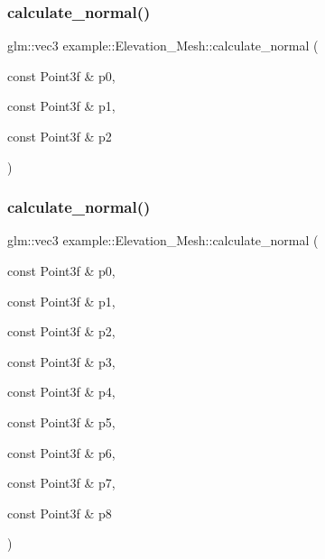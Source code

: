 \subsubsection{\texorpdfstring{calculate\+\_\+normal()}{calculate\_normal()}\hspace{0.1cm}{\footnotesize\ttfamily [1/2]}}
{\footnotesize\ttfamily glm\+::vec3 example\+::\+Elevation\+\_\+\+Mesh\+::calculate\+\_\+normal (\begin{DoxyParamCaption}\item[{const Point3f \&}]{p0,  }\item[{const Point3f \&}]{p1,  }\item[{const Point3f \&}]{p2 }\end{DoxyParamCaption})}

\mbox{\label{classexample_1_1_elevation___mesh_aee6583fd55f431f0a6b8dc8e99b6db94}} 
\subsubsection{\texorpdfstring{calculate\+\_\+normal()}{calculate\_normal()}\hspace{0.1cm}{\footnotesize\ttfamily [2/2]}}
{\footnotesize\ttfamily glm\+::vec3 example\+::\+Elevation\+\_\+\+Mesh\+::calculate\+\_\+normal (\begin{DoxyParamCaption}\item[{const Point3f \&}]{p0,  }\item[{const Point3f \&}]{p1,  }\item[{const Point3f \&}]{p2,  }\item[{const Point3f \&}]{p3,  }\item[{const Point3f \&}]{p4,  }\item[{const Point3f \&}]{p5,  }\item[{const Point3f \&}]{p6,  }\item[{const Point3f \&}]{p7,  }\item[{const Point3f \&}]{p8 }\end{DoxyParamCaption})}

\mbox{\label{classexample_1_1_elevation___mesh_a67216abcf32e92e3da91810e10822c6e}} 
